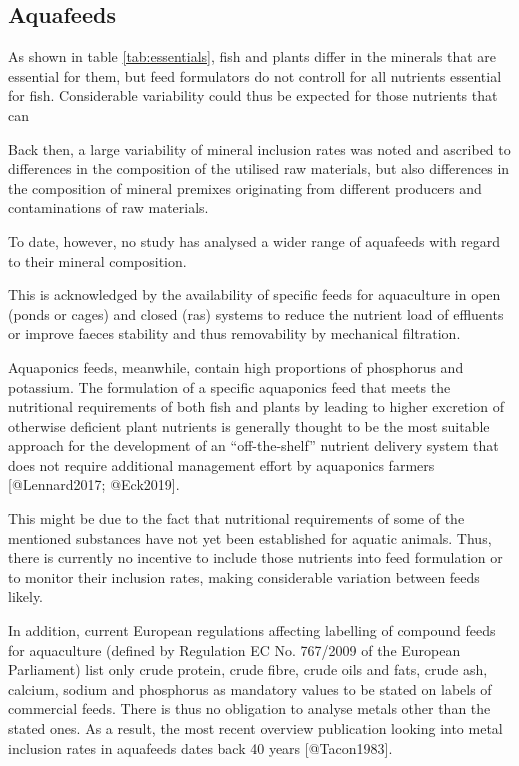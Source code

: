 \subsection{Aquafeeds}
As shown in table \ref{tab:essentials}, fish and plants differ in the minerals that are essential for them, but feed formulators do not controll for all nutrients essential for fish. Considerable variability could thus be expected for those nutrients that can





Back then, a large variability of mineral inclusion rates was noted and ascribed to differences in the composition of the utilised raw materials, but also differences in the composition of mineral premixes originating from different producers and contaminations of raw materials.







To date, however, no study has analysed a wider range of aquafeeds with regard to their mineral composition.




This is acknowledged by the availability of specific feeds for aquaculture in open (ponds or cages) and closed (\gls{ras}) systems to reduce the nutrient load of effluents or improve faeces stability and thus removability by mechanical filtration.

Aquaponics feeds, meanwhile, contain high proportions of phosphorus and potassium. The formulation of a specific aquaponics feed that meets the nutritional requirements of both fish and plants by leading to higher excretion of otherwise deficient plant nutrients is generally thought to be the most suitable approach for the development of an “off-the-shelf” nutrient delivery system that does not require additional management effort by aquaponics farmers [@Lennard2017; @Eck2019].



 This might be due to the fact that nutritional requirements of some of the mentioned substances have not yet been established for aquatic animals. Thus, there is currently no incentive to include those nutrients into feed formulation or to monitor their inclusion rates, making considerable variation between feeds likely.

In addition, current European regulations affecting labelling of compound feeds for aquaculture (defined by Regulation EC No. 767/2009 of the European Parliament) list only crude protein, crude fibre, crude oils and fats, crude ash, calcium, sodium and phosphorus as mandatory values to be stated on labels of commercial feeds. There is thus no obligation to analyse metals other than the stated ones. As a result, the most recent overview publication looking into metal inclusion rates in aquafeeds dates back 40 years [@Tacon1983].





